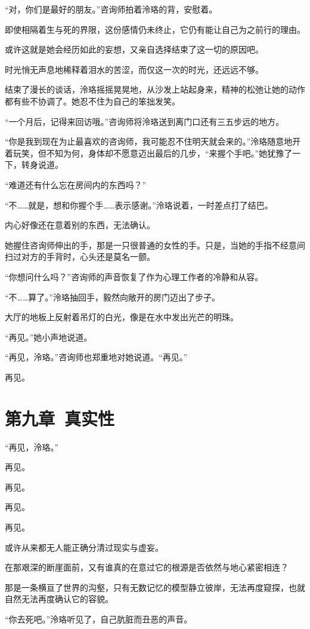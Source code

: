 \documentclass[UTF8, scheme = chinese, openany]{ctexbook}
\begin{document}
“对，你们是最好的朋友。”咨询师拍着泠珞的背，安慰着。

即使相隔着生与死的界限，这份感情仍未终止，它仍有能让自己为之前行的理由。

或许这就是她会经历如此的妄想，又亲自选择结束了这一切的原因吧。

时光悄无声息地稀释着泪水的苦涩，而仅这一次的时光，还远远不够。

结束了漫长的谈话，泠珞摇摇晃晃地，从沙发上站起身来，精神的松弛让她的动作都有些不协调了。她忍不住为自己的笨拙发笑。

“一个月后，记得来回访哦。”咨询师将泠珞送到离门口还有三五步远的地方。

“你是我到现在为止最喜欢的咨询师，我可能忍不住明天就会来的。”泠珞随意地开着玩笑，但不知为何，身体却不愿意迈出最后的几步，“来握个手吧。”她犹豫了一下，转身说道。

“难道还有什么忘在房间内的东西吗？”

“不……就是，想和你握个手……表示感谢。”泠珞说着，一时差点打了结巴。

内心好像还在意着别的东西，无法确认。

她握住咨询师伸出的手，那是一只很普通的女性的手。只是，当她的手指不经意间扫过对方的手背时，心头还是莫名一颤。

“你想问什么吗？”咨询师的声音恢复了作为心理工作者的冷静和从容。

“不……算了。”泠珞抽回手，毅然向敞开的房门迈出了步子。

大厅的地板上反射着吊灯的白光，像是在水中发出光芒的明珠。

“再见。”她小声地说道。

“再见，泠珞。”咨询师也郑重地对她说道。“再见。”

再见。

\chapter{第九章\ 真实性}

“再见，泠珞。”

再见。

再见。

再见。

再见。

或许从来都无人能正确分清过现实与虚妄。

在那艰深的断崖面前，又有谁真的在意过它的根源是否依然与地心紧密相连？

那是一条横亘了世界的沟壑，只有无数记忆的模型静立彼岸，无法再度窥探，也就自然无法再度确认它的容貌。

“你去死吧。”泠珞听见了，自己肮脏而丑恶的声音。
\end{document}
